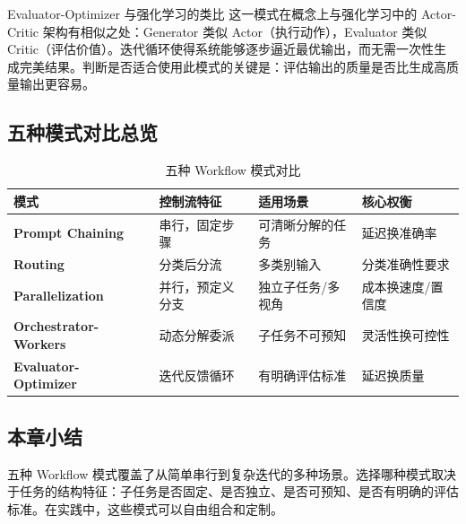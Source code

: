 \begin{knowledgebox}{Evaluator-Optimizer 与强化学习的类比}
这一模式在概念上与强化学习中的 Actor-Critic 架构有相似之处：Generator 类似 Actor（执行动作），Evaluator 类似 Critic（评估价值）。迭代循环使得系统能够逐步逼近最优输出，而无需一次性生成完美结果。判断是否适合使用此模式的关键是：评估输出的质量是否比生成高质量输出更容易。
\end{knowledgebox}

\subsection{五种模式对比总览}

\begin{table}[H]
\centering
\small
\begin{tabular}{>{\bfseries}p{2.8cm} p{3.2cm} p{3cm} p{3.5cm}}
\toprule
模式 & 控制流特征 & 适用场景 & 核心权衡 \\
\midrule
Prompt Chaining & 串行，固定步骤 & 可清晰分解的任务 & 延迟换准确率 \\
Routing & 分类后分流 & 多类别输入 & 分类准确性要求 \\
Parallelization & 并行，预定义分支 & 独立子任务/多视角 & 成本换速度/置信度 \\
Orchestrator- Workers & 动态分解委派 & 子任务不可预知 & 灵活性换可控性 \\
Evaluator- Optimizer & 迭代反馈循环 & 有明确评估标准 & 延迟换质量 \\
\bottomrule
\end{tabular}
\caption{五种 Workflow 模式对比}
\end{table}

\subsection{本章小结}
五种 Workflow 模式覆盖了从简单串行到复杂迭代的多种场景。选择哪种模式取决于任务的结构特征：子任务是否固定、是否独立、是否可预知、是否有明确的评估标准。在实践中，这些模式可以自由组合和定制。


